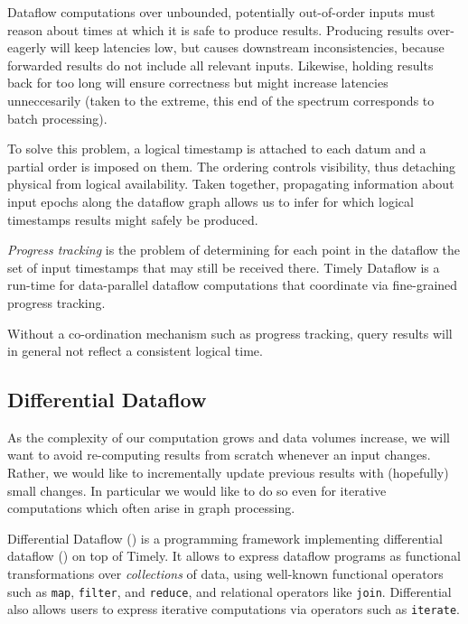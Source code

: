 \documentclass[../index.tex]{subfiles}
\begin{document}
Dataflow computations over unbounded, potentially out-of-order inputs
must reason about times at which it is safe to produce
results. Producing results over-eagerly will keep latencies low, but
causes downstream inconsistencies, because forwarded results do not
include all relevant inputs. Likewise, holding results back for too
long will ensure correctness but might increase latencies
unneccesarily (taken to the extreme, this end of the spectrum
corresponds to batch processing).

To solve this problem, a logical timestamp is attached to each datum
and a partial order is imposed on them. The ordering controls
visibility, thus detaching physical from logical availability. Taken
together, propagating information about input epochs along the
dataflow graph allows us to infer for which logical timestamps results
might safely be produced.

\emph{Progress tracking} is the problem of determining for each point
in the dataflow the set of input timestamps that may still be received
there. Timely Dataflow is a run-time for data-parallel dataflow
computations that coordinate via fine-grained progress tracking.

Without a co-ordination mechanism such as progress tracking, query
results will in general not reflect a consistent logical time.

\subsection{Differential Dataflow} \label{background-differential}

As the complexity of our computation grows and data volumes increase,
we will want to avoid re-computing results from scratch whenever an
input changes. Rather, we would like to incrementally update previous
results with (hopefully) small changes. In particular we would like to
do so even for iterative computations which often arise in graph
processing.

Differential Dataflow (\cite{differential}) is a programming framework
implementing differential dataflow (\cite{mcsherry2013differential})
on top of Timely. It allows to express dataflow programs as functional
transformations over \emph{collections} of data, using well-known
functional operators such as \texttt{map}, \texttt{filter}, and
\texttt{reduce}, and relational operators like
\texttt{join}. Differential also allows users to express iterative
computations via operators such as \texttt{iterate}.
\end{document}
